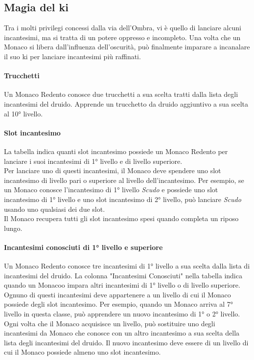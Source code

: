 \subsection{Magia del ki}

Tra i molti privilegi concessi dalla via dell'Ombra, vi è quello di lanciare alcuni incantesimi, ma si tratta di un potere oppresso e incompleto. Una volta che un Monaco si libera dall'influenza dell'oscurità, può finalmente imparare a incanalare il suo ki per lanciare incantesimi più raffinati.

\paragraph{Trucchetti} Un Monaco Redento conosce due trucchetti a sua scelta tratti dalla lista degli incantesimi del druido. Apprende un trucchetto da druido aggiuntivo a sua scelta al 10° livello.

\paragraph{Slot incantesimo}La tabella indica quanti slot incantesimo possiede un Monaco Redento per lanciare i suoi incantesimi di 1° livello e di livello superiore. \\ Per lanciare uno di questi incantesimi, il Monaco deve spendere uno slot incantesimo di livello pari o superiore al livello dell'incantesimo. Per esempio, se un Monaco conosce l'incantesimo di 1° livello \textit{Scudo} e possiede uno slot incantesimo di 1° livello e uno slot incantesimo di 2° livello, può lanciare \textit{Scudo} usando uno qualsiasi dei due slot. \\ Il Monaco recupera tutti gli slot incantesimo spesi quando completa un riposo lungo.

\paragraph{Incantesimi conosciuti di 1° livello e superiore}Un Monaco Redento conosce tre incantesimi di 1° livello a sua scelta dalla lista di incantesimi del druido. La colonna "Incantesimi Conosciuti" nella tabella indica quando un Monacoo impara altri incantesimi di 1° livello o di livello superiore. Ognuno di questi incantesimi deve appartenere a un livello di cui il Monaco possiede degli slot incantesimo. Per esempio, quando un Monaco arriva al 7° livello in questa classe, può apprendere un nuovo incantesimo di 1° o 2° livello. \\ Ogni volta che il Monaco acquisisce un livello, può sostituire uno degli incantesimi da Monaco che conosce con un altro incantesimo a sua scelta della lista degli incantesimi del druido. Il nuovo incantesimo deve essere di un livello di cui il Monaco possiede almeno uno slot incantesimo.

